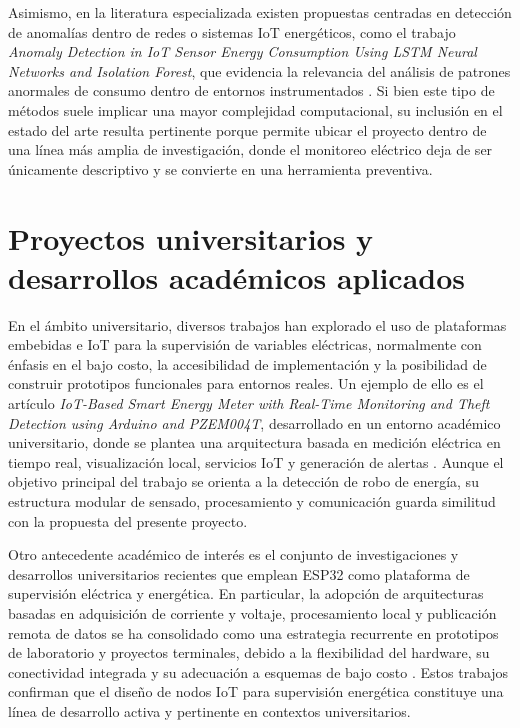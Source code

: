﻿\documentclass[12pt,openright,oneside]{report}
\theoremstyle{mytheoremstyle}
\theoremstyle{mytheoremstyle}
\theoremstyle{myproblemstyle}
\begin{document}
Asimismo, en la literatura especializada existen propuestas centradas en detección de anomalías dentro de redes o sistemas IoT energéticos, como el trabajo \textit{Anomaly Detection in IoT Sensor Energy Consumption Using LSTM Neural Networks and Isolation Forest}, que evidencia la relevancia del análisis de patrones anormales de consumo dentro de entornos instrumentados \cite{iot-anomaly-lstm-2024}. Si bien este tipo de métodos suele implicar una mayor complejidad computacional, su inclusión en el estado del arte resulta pertinente porque permite ubicar el proyecto dentro de una línea más amplia de investigación, donde el monitoreo eléctrico deja de ser únicamente descriptivo y se convierte en una herramienta preventiva.

\section{Proyectos universitarios y desarrollos académicos aplicados}

En el ámbito universitario, diversos trabajos han explorado el uso de plataformas embebidas e IoT para la supervisión de variables eléctricas, normalmente con énfasis en el bajo costo, la accesibilidad de implementación y la posibilidad de construir prototipos funcionales para entornos reales. Un ejemplo de ello es el artículo \textit{IoT-Based Smart Energy Meter with Real-Time Monitoring and Theft Detection using Arduino and PZEM004T}, desarrollado en un entorno académico universitario, donde se plantea una arquitectura basada en medición eléctrica en tiempo real, visualización local, servicios IoT y generación de alertas \cite{ijert-smart-meter-2025}. Aunque el objetivo principal del trabajo se orienta a la detección de robo de energía, su estructura modular de sensado, procesamiento y comunicación guarda similitud con la propuesta del presente proyecto.

Otro antecedente académico de interés es el conjunto de investigaciones y desarrollos universitarios recientes que emplean ESP32 como plataforma de supervisión eléctrica y energética. En particular, la adopción de arquitecturas basadas en adquisición de corriente y voltaje, procesamiento local y publicación remota de datos se ha consolidado como una estrategia recurrente en prototipos de laboratorio y proyectos terminales, debido a la flexibilidad del hardware, su conectividad integrada y su adecuación a esquemas de bajo costo \cite{smart-energy-esp32-2024,esp32-bill-predictor-2025}. Estos trabajos confirman que el diseño de nodos IoT para supervisión energética constituye una línea de desarrollo activa y pertinente en contextos universitarios.
\end{document}
